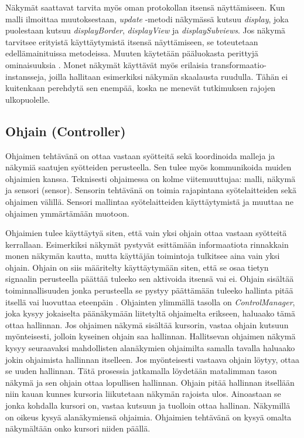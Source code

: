 \documentclass[utf8]{gradu3}
\begin{document}
Näkymät saattavat tarvita myös oman protokollan itsensä näyttämiseen. Kun malli ilmoittaa muutoksestaan, \textit{update} -metodi näkymässä kutsuu \textit{display}, joka puolestaan kutsuu \textit{displayBorder}, \textit{displayView} ja \textit{displaySubviews}. Jos näkymä tarvitsee erityistä käyttäytymistä itsensä näyttämiseen, se toteutetaan edellämainituissa metodeissa. Muuten käytetään pääluokasta perittyjä ominaisuuksia \parencite{burbeck}. Monet näkymät käyttävät myös erilaisia transformaatio-instansseja, joilla hallitaan esimerkiksi näkymän skaalausta ruudulla. Tähän ei kuitenkaan perehdytä sen enempää, koska ne menevät tutkimuksen rajojen ulkopuolelle.


\subsection{Ohjain (Controller)}
Ohjaimen tehtävänä on ottaa vastaan syötteitä sekä koordinoida malleja ja näkymiä saatujen syötteiden perusteella. Sen tulee myös kommunikoida muiden ohjaimien kanssa. Teknisesti ohjaimessa on kolme viitemuuttujaa: malli, näkymä ja sensori (sensor). Sensorin tehtävänä on toimia rajapintana syötelaitteiden sekä ohjaimen välillä. Sensori mallintaa syötelaitteiden käyttäytymistä ja muuttaa ne ohjaimen ymmärtämään muotoon.

Ohjaimien tulee käyttäytyä siten, että vain yksi ohjain ottaa vastaan syötteitä kerrallaan. Esimerkiksi näkymät pystyvät esittämään informaatiota rinnakkain monen näkymän kautta, mutta käyttäjän toimintoja tulkitsee aina vain yksi ohjain. Ohjain on siis määritelty käyttäytymään siten, että se osaa tietyn signaalin perusteella päättää tuleeko sen aktivoida itsensä vai ei. Ohjain sisältää toiminnallisuuden jonka perusteella se pystyy päättämään tuleeko hallinta pitää itsellä vai luovuttaa eteenpäin \parencite[s. 9]{krasner_desc}. Ohjainten ylimmällä tasolla on \textit{ControlManager}, joka kysyy jokaiselta päänäkymään liitetyltä ohjaimelta erikseen, haluaako tämä ottaa hallinnan. Jos ohjaimen näkymä sisältää kursorin, vastaa ohjain kutsuun myönteisesti, jolloin kyseinen ohjain saa hallinnan. Hallitsevan ohjaimen näkymä kysyy seuraavaksi mahdollisten alanäkymien ohjaimilta samalla tavalla haluaako jokin ohjaimista hallinnan itselleen. Jos myönteisesti vastaava ohjain löytyy, ottaa se uuden hallinnan. Tätä prosessia jatkamalla löydetään matalimman tason näkymä ja sen ohjain ottaa lopullisen hallinnan. Ohjain pitää hallinnan itsellään niin kauan kunnes kursoria liikutetaan näkymän rajoista ulos. Ainoastaan se jonka kohdalla kursori on, vastaa kutsuun ja tuolloin ottaa hallinan. Näkymillä on oikeus kysyä alanäkymiensä ohjaimia. Ohjaimien tehtävänä on kysyä omalta näkymältään onko kursori niiden päällä.
\end{document}
